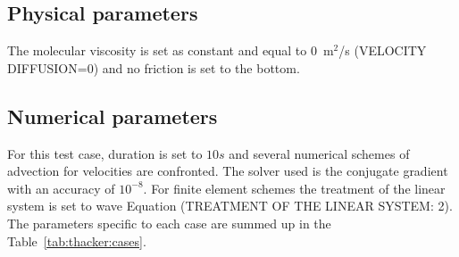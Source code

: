 \subsection{Physical parameters}


The molecular viscosity is set as constant and equal to 0~m$^2$/s (VELOCITY DIFFUSION=0) and
no friction is set to the bottom.

\subsection{Numerical parameters}

For this test case, duration is set to $10s$ and several numerical schemes of advection for velocities are confronted. The solver used is the conjugate gradient with an accuracy of $10^{-8}$.
For finite element schemes the treatment of the linear system is set to wave Equation (TREATMENT OF THE LINEAR SYSTEM: 2).
The parameters specific to each case are summed up in the Table~\ref{tab:thacker:cases}.
\begin{table}[H]
  \caption{List of the simulation parameters used for the six cases tested in the Thacker example.}
  \label{tab:thacker:cases}
\end{table}

